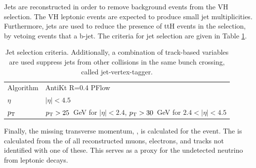 Jets are reconstructed in order to remove background events from the VH selection.
The VH leptonic events are expected to produce small jet multiplicities.
Furthermore, jets are used to reduce the presence of ttH events in the selection, by vetoing events that a b-jet.
The criteria for jet selection are given in Table \ref{tab:hmmJetObjSel}.

\begin{table}[H]
    \begin{center}
    \begin{tabular}{ll}
        \toprule
        Algorithm        &AntiKt R=0.4 PFlow\\
        $\eta$            &$|\eta| < 4.5$    \\
        $p_\text{T}$            &$p_\text{T} > 25$~GeV for $|\eta| < 2.4$, $p_\text{T} > 30$~GeV for $2.4 < |\eta| < 4.5$ \\
        \bottomrule
    \end{tabular}
    \caption{Jet selection criteria. Additionally, a combination of track-based variables are used suppress jets from other collisions in the same bunch crossing, called jet-vertex-tagger.\cite{ATLAS-CONF-2014-018}}
    \label{tab:hmmJetObjSel}
    \end{center}
\end{table}

Finally, the missing transverse momentum, \met, is calculated for the event.
The \met is calculated from the \pt of all reconstructed muons, electrons, and tracks not identified with one of these.
This serves as a proxy for the undetected neutrino from leptonic \W decays.

